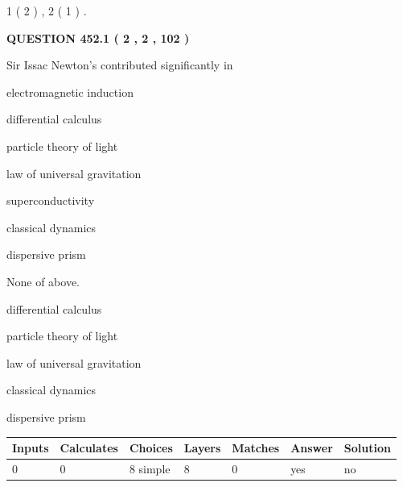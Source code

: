 \documentclass[12pt]{article}
\begin{document}
   
   1 ( 2 )
 ,
   2 ( 1 )
 .
  
\vspace{0.2in}
  
{\textbf{\Large{QUESTION
452.1 
 ( 2 , 2 , 102 )
}}}
  
  
Sir Issac Newton's contributed significantly in
 
 
electromagnetic induction
 
 
differential calculus
 
 
particle theory of light
 
 
law of universal gravitation
 
 
superconductivity
 
 
classical dynamics
 
 
dispersive prism
 
 
 None of above.
 
 
\noindent{}
 
 
differential calculus
 
 
particle theory of light
 
 
law of universal gravitation
 
 
classical dynamics
 
 
dispersive prism
 
 
\noindent{}
 
 
   
   
   
   
\noindent\begin{tabular}{|l|l|l|l|l|l|l|}
 \hline
Inputs & Calculates & Choices & Layers & Matches & Answer & Solution \\ \hline
 0  & 
 0  & 
 8
  simple  
  & 
 8  & 
 0  & 
  yes & 
  no 
  \\ \hline
 \end{tabular}
   
   
   
   
\noindent{}
   
\end{document}
